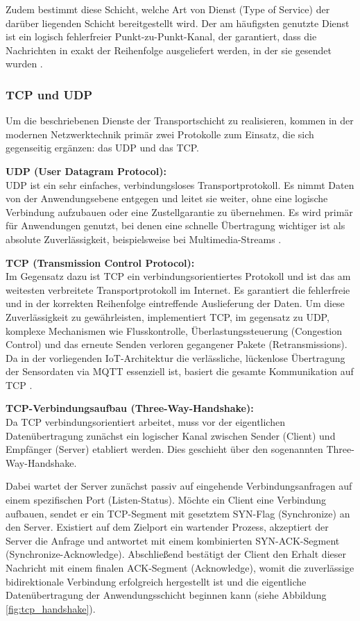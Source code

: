 Zudem bestimmt diese Schicht, welche Art von Dienst (Type of Service) der darüber liegenden Schicht bereitgestellt wird. Der am häufigsten genutzte Dienst ist ein logisch fehlerfreier Punkt-zu-Punkt-Kanal, der garantiert, dass die Nachrichten in exakt der Reihenfolge ausgeliefert werden, in der sie gesendet wurden . 

\subsubsection{TCP und UDP}
Um die beschriebenen Dienste der Transportschicht zu realisieren, kommen in der modernen Netzwerktechnik primär zwei Protokolle zum Einsatz, die sich gegenseitig ergänzen: das \ac{UDP} und das \ac{TCP}.

\textbf{UDP (User Datagram Protocol):}\\
UDP ist ein sehr einfaches, verbindungsloses Transportprotokoll. Es nimmt Daten von der Anwendungsebene entgegen und leitet sie weiter, ohne eine logische Verbindung aufzubauen oder eine Zustellgarantie zu übernehmen. Es wird primär für Anwendungen genutzt, bei denen eine schnelle Übertragung wichtiger ist als absolute Zuverlässigkeit, beispielsweise bei Multimedia-Streams .

\textbf{TCP (Transmission Control Protocol):}\\
Im Gegensatz dazu ist TCP ein verbindungsorientiertes Protokoll und ist das am weitesten verbreitete Transportprotokoll im Internet. Es garantiert die fehlerfreie und in der korrekten Reihenfolge eintreffende Auslieferung der Daten. Um diese Zuverlässigkeit zu gewährleisten, implementiert TCP, im gegensatz zu UDP, komplexe Mechanismen wie Flusskontrolle, Überlastungssteuerung (Congestion Control) und das erneute Senden verloren gegangener Pakete (Retransmissions). Da in der vorliegenden \ac{IoT}-Architektur die verlässliche, lückenlose Übertragung der Sensordaten via \ac{MQTT} essenziell ist, basiert die gesamte Kommunikation auf TCP .

\textbf{TCP-Verbindungsaufbau (Three-Way-Handshake):}\\
Da TCP verbindungsorientiert arbeitet, muss vor der eigentlichen Datenübertragung zunächst ein logischer Kanal zwischen Sender (Client) und Empfänger (Server) etabliert werden. Dies geschieht über den sogenannten Three-Way-Handshake. 

Dabei wartet der Server zunächst passiv auf eingehende Verbindungsanfragen auf einem spezifischen Port (Listen-Status). Möchte ein Client eine Verbindung aufbauen, sendet er ein TCP-Segment mit gesetztem SYN-Flag (Synchronize) an den Server. Existiert auf dem Zielport ein wartender Prozess, akzeptiert der Server die Anfrage und antwortet mit einem kombinierten SYN-ACK-Segment (Synchronize-Acknowledge). Abschließend bestätigt der Client den Erhalt dieser Nachricht mit einem finalen ACK-Segment (Acknowledge), womit die zuverlässige bidirektionale Verbindung erfolgreich hergestellt ist und die eigentliche Datenübertragung der Anwendungsschicht beginnen kann (siehe Abbildung \ref{fig:tcp_handshake}).

